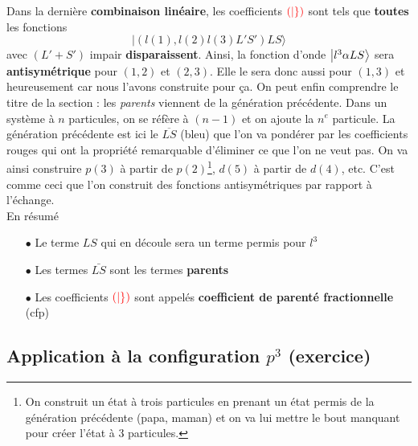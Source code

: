 Dans la dernière \textbf{combinaison linéaire}, les coefficients ${\color{red}(|\})}$ sont tels que
\textbf{toutes} les fonctions
\begin{equation}
\vert \left( l(1), l(2) l(3)  L' S' \right) L S \rangle
\end{equation}
avec $(L'+S')$ impair \textbf{disparaissent}. Ainsi, la fonction d'onde $\ket{l^3\alpha LS}$ sera
\textbf{antisymétrique} pour $(1,2)$ et $(2,3)$. Elle le sera donc aussi pour $(1,3)$ et heureusement
car nous l'avons construite pour ça. On peut enfin comprendre le titre de la section : les 
\textit{parents} viennent de la génération précédente. Dans un système à $n$ particules, on se
réfère à $(n-1)$ et on ajoute la $n^e$ particule. La génération précédente est ici le 
$\overline{LS}$ (bleu) que l'on va pondérer par les coefficients rouges qui ont la propriété
remarquable d'éliminer ce que l'on ne veut pas. On va ainsi construire $p(3)$ à partir de 
$p(2)$\footnote{On construit un état à trois particules en prenant un état permis de la génération précédente (papa, maman) et on va lui mettre le bout manquant pour créer l'état à 3 particules.}, $d(5)$ à partir de $d(4)$, etc. C'est comme ceci que l'on construit des fonctions 
antisymétriques par rapport à l'échange.\\

En résumé
\begin{itemize}
\item[$\bullet$] Le terme $LS$ qui en découle sera un terme permis pour $l^3$
\item[$\bullet$] Les termes $\bar{LS}$ sont les termes \textbf{parents}
\item[$\bullet$] Les coefficients ${\color{red}(|\})}$ sont appelés \textbf{coefficient de 
parenté fractionnelle} (cfp)
\end{itemize}

\subsection{Application à la configuration $p^3$ (exercice)}
